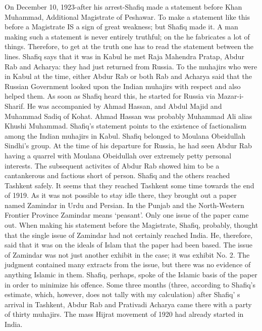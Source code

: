 On December 10, 1923-after his arrest-Shafiq made a statement before Khan Muhammad, Additional Magistrate of Peshawar. To make a statement like this before a Magistrate IS a sign of great weakness; but Shafiq made it. A man making such a statement is never entirely truthful; on the he fabricates a lot of things. Therefore, to get at the truth one has to read the statement between the lines. Shafiq says that it was in Kabul he met Raja Mahendra Pratap, Abdur Rab and Acharya: they had just returned from Russia. To the muhajirs who were in Kabul at the time, either Abdur Rab or both Rab and Acharya said that the Russian Government looked upon the Indian muhajirs with respect and also helped them. As soon as Shafiq heard this, he started for Russia via Mazar-i-Sharif. He was accompanied by Ahmad Hassan, and Abdul Majid and Muhammad Sadiq of Kohat. Ahmad Hassan was probably Muhammad Ali alias Khushi Muhammad. Shafiq's statement points to the existence of factionalism among the Indian muhajirs in Kabul. Shafiq belonged to Moulana Obeidullah Sindhi's group. At the time of his departure for Russia, he had seen Abdur Rab having a quarrel with Moulana Obeidullah over extremely petty personal interests. The subsequent activites of Abdur Rab showed him to be a cantankerous and factious short of person. Shafiq and the others reached Tashkent safely. It seems that they reached Tashkent some time towards the end of 1919. As it was not possible to stay idle there, they brought out a paper named Zamindar in Urdu and Persian. In the Punjab and the North-Western Frontier Province Zamindar means ‘peasant’. Only one issue of the paper came out. When making his statement before the Magistrate, Shafiq, probably, thought that the single issue of Zamindar had not certainly reached India. He, therefore, said that it was on the ideals of Islam that the paper had been based. The issue of Zamindar was not just another exhibit in the case; it was exhibit No. 2. The judgment contained many extracts from the issue, but there was no evidence of anything Islamic in them. Shafiq, perhaps, spoke of the Islamic basis of the paper in order to minimize his offence. Some three months (three, according to Shafiq’s estimate, which, however, does not tally with my calculation) after Shafiq’ s arrival in Tashkent, Abdur Rab and Prativadi Acharya came there with a party of thirty muhajirs. The mass Hijrat movement of 1920 had already started in India. 


